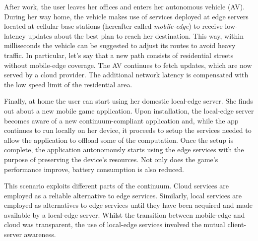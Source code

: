 After work, the user leaves her offices and enters her autonomous vehicle (AV). During her way home, the vehicle makes use of services deployed at edge servers located at cellular base stations (hereafter called \textit{mobile-edge}) to receive low-latency updates about the best plan to reach her destination. This way, within milliseconds the vehicle can be suggested to adjust its routes to avoid heavy traffic. In particular, let's say that a new path consists of residential streets without mobile-edge coverage. The AV continues to fetch updates, which are now served by a cloud provider. The additional network latency is compensated with the low speed limit of the residential area.

Finally, at home the user can start using her domestic local-edge server. She finds out about a new mobile game application. Upon installation, the local-edge server becomes aware of a new continuum-compliant application and, while the app continues to run locally on her device, it proceeds to setup the services needed to allow the application to offload some of the computation. Once the setup is complete, the application autonomously starts using the edge services with the purpose of preserving the device's resources. Not only does the game's performance improve, battery consumption is also reduced.  

This scenario exploits different parts of the continuum. Cloud services are employed as a reliable alternative to edge services. Similarly, local services are employed as alternatives to edge services until they have been acquired and made available by a local-edge server. Whilst the transition between mobile-edge and cloud was transparent, the use of local-edge services involved the mutual client-server awareness.